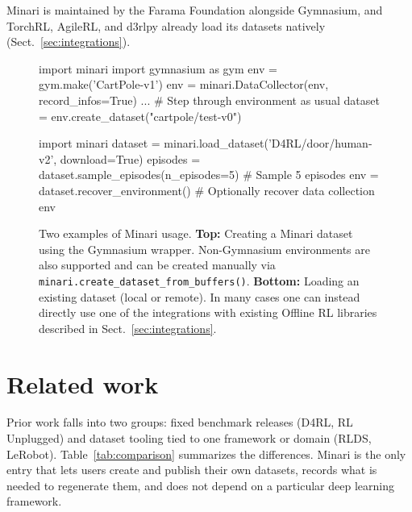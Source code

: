 \documentclass{article}
\begin{document}
Minari is maintained by the Farama Foundation alongside Gymnasium, and TorchRL, AgileRL, and d3rlpy already load its datasets natively (Sect.~\ref{sec:integrations}).

\begin{figure}[t]
    \centering
   \begin{pythonsmall}
  import minari
  import gymnasium as gym
  env = gym.make('CartPole-v1')
  env = minari.DataCollector(env, record_infos=True)
  ... # Step through environment as usual
  dataset = env.create_dataset("cartpole/test-v0")\end{pythonsmall}
   \begin{pythonsmall}
  import minari
  dataset = minari.load_dataset('D4RL/door/human-v2', download=True)
  episodes = dataset.sample_episodes(n_episodes=5) # Sample 5 episodes
  env = dataset.recover_environment() # Optionally recover data collection env\end{pythonsmall}
  \caption{Two examples of Minari usage. \textbf{Top:} Creating a Minari dataset using the Gymnasium wrapper. Non-Gymnasium environments are also supported and can be created manually via \lstinline|minari.create_dataset_from_buffers()|. \textbf{Bottom:} Loading an existing dataset (local or remote). In many cases one can instead directly use one of the integrations with existing Offline RL  libraries described in Sect.~\ref{sec:integrations}.}
    \label{fig:code}
\end{figure}

\section{Related work}
Prior work falls into two groups: fixed benchmark releases (D4RL, RL Unplugged) and dataset tooling tied to one framework or domain (RLDS, LeRobot). Table~\ref{tab:comparison} summarizes the differences. Minari is the only entry that lets users create and publish their own datasets, records what is needed to regenerate them, and does not depend on a particular deep learning framework.
\end{document}
